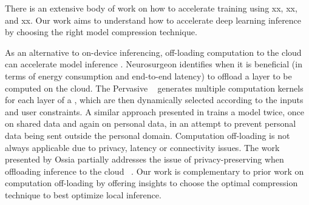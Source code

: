 There is an extensive body of work on how to accelerate \DNN training using xx, xx, and xx. Our work aims to understand how to accelerate
deep learning inference by choosing the right model compression technique.


As an alternative to on-device inferencing, off-loading computation to the cloud can accelerate \DNN model inference
\cite{teerapittayanon2017distributed}. Neurosurgeon \cite{Kang2017neurosurgeon} identifies when it is beneficial (\eg in terms of energy
consumption and end-to-end latency) to offload a \DNN layer to be computed on the cloud. The Pervasive \CNN~\cite{song2017towards} generates
multiple computation kernels for each layer of a \CNN, which are then dynamically selected according to the inputs and user constraints. A
similar approach presented in \cite{servia2017personal} trains a model twice, once on shared data and again on personal data, in an attempt to
prevent personal data being sent outside the personal domain. Computation off-loading is not always applicable due to privacy, latency or
connectivity issues. The work presented by Ossia \etal partially addresses the issue of privacy-preserving when offloading \DNN inference
to the cloud ~\cite{osia2017hybrid}. Our work is complementary to prior work on computation off-loading by offering insights to choose the
optimal compression technique to best optimize local inference.


